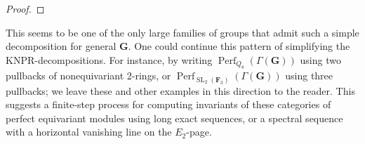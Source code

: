 \documentclass[11pt, a4paper]{article}
\DeclareMathOperator{\SL}{SL}
\newcommand{\1}{\mathbf{1}}
\DeclareMathOperator{\Perf}{Perf}
\newcommand{\calC}{\mathcal{C}}
\newcommand{\F}{\mathbf{F}}
\newcommand{\G}{\mathbf{G}}
\newcommand{\Ga}{\Gamma}
\theoremstyle{plain}
\newtheorem{prop}[equation]{Proposition}
\theoremstyle{definition}
\theoremstyle{remark}\numberwithin{equation}{section}
\begin{document}
\begin{proof}
\end{proof}

This seems to be one of the only large families of groups that admit such a simple decomposition for general $\G$. One could continue this pattern of simplifying the KNPR-decompositions. For instance, by writing $\Perf_{Q_8}(\Ga(\G))$ using two pullbacks of nonequivariant 2-rings, or $\Perf_{\SL_2(\F_3)}(\Ga(\G))$ using three pullbacks; we leave these and other examples in this direction to the reader. This suggests a finite-step process for computing invariants of these categories of perfect equivariant modules using long exact sequences, or a spectral sequence with a horizontal vanishing line on the $E_2$-page.


\end{document}
